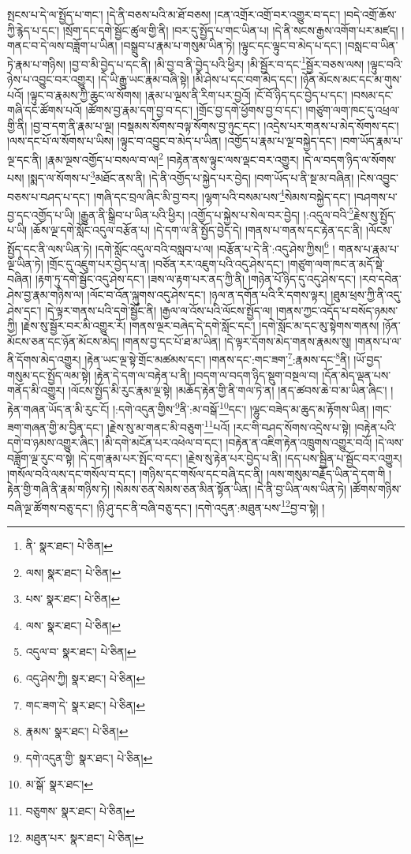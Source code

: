 སྤངས་པ་དེ་ལ་སྤྱོད་པ་གང་། །དེ་ནི་བཅས་པའི་མ་ཐོ་བཅས། །ངན་འགྲོར་འགྲོ་བར་འགྱུར་བ་དང་། །བདེ་འགྲོ་ཆོས་ཀྱི་རྙེད་པ་དང་། །སྲོག་དང་དགེ་སྦྱོང་ཚུལ་གྱི་ནི། །བར་དུ་སྤྱོད་པ་གང་ཡིན་པ། །དེ་ནི་སངས་རྒྱས་འགོག་པར་མཛད། །གནང་བ་དེ་ལས་བཟློག་པ་ཡིན། །བསྒྲུབ་པ་རྣམ་པ་གསུམ་ཡིན་ཏེ། །ལྟུང་དང་ལྟུང་བ་མེད་པ་དང་། །བསླང་བ་ཡིན་ཏེ་རྣམ་པ་གཉིས། །བྱ་བ་མི་བྱེད་པ་དང་ནི། །མི་བྱ་བ་ནི་བྱེད་པའི་ཕྱིར། །མི་སྦྱོར་བ་དང་\footnote{ནི་  སྣར་ཐང་།  པེ་ཅིན། }སྦྱོར་བཅས་ལས། །ལྟུང་བའི་ཉེས་པ་འབྱུང་བར་འགྱུར། །དེ་ཡི་རྒྱུ་ཡང་རྣམ་བཞི་སྟེ། །མི་ཤེས་པ་དང་བག་མེད་དང་། །ཉོན་མོངས་མང་དང་མ་གུས་པའོ། །ལྟུང་བ་རྣམས་ཀྱི་ཆུང་ལ་སོགས། །རྣམ་པ་ལྔས་ནི་རིག་པར་བྱའོ། །ངོ་བོ་ཉིད་དང་བྱེད་པ་དང་། །བསམ་དང་གཞི་དང་ཚོགས་པའོ། །ཚོགས་བྱ་རྣམ་དག་བྱ་བ་དང་། །གྲོང་བྱ་དགེ་ཕྱོགས་བྱ་བ་དང་། །གཙུག་ལག་ཁང་དུ་འཕྲལ་གྱི་ནི། །བྱ་བ་དག་ནི་རྣམ་པ་ལྔ། །བསྡམས་སོགས་བལྟ་སོགས་བྱ་ཉུང་དང་། །འདྲེས་པར་གནས་པ་མེད་སོགས་དང་། །ལས་དང་པོ་ལ་སོགས་པ་ཡིས། །ལྟུང་བ་འབྱུང་བ་མེད་པ་ཡིན། །འགྱོད་པ་རྣམ་པ་ལྔ་བསྐྱེད་དང་། །བག་ཡོད་རྣམ་པ་ལྔ་དང་ནི། །རྣམ་ལྔས་འགྱོད་པ་བསལ་བ་ལ།\footnote{ལས།  སྣར་ཐང་།  པེ་ཅིན། } །བརྟེན་ནས་ལྟུང་ལས་ལྡང་བར་འགྱུར། །དེ་ལ་བདག་ཉིད་ལ་སོགས་པས། །སྨད་ལ་སོགས་པ་\footnote{པས་  སྣར་ཐང་།  པེ་ཅིན། }མཐོང་ནས་ནི། །དེ་ནི་འགྱོད་པ་སྐྱེད་པར་བྱེད། །བག་ཡོད་པ་ནི་སྔ་མ་བཞིན། །ངེས་འབྱུང་བཅས་པ་བཤད་པ་དང་། །གཞི་དང་བྲལ་ཞིང་མི་བྱ་བར། །ལྷག་པའི་བསམ་པས་\footnote{ལས་  སྣར་ཐང་།  པེ་ཅིན། }སེམས་བསྐྱེད་དང་། །བཤགས་པ་བྱ་དང་འགྱོད་པ་ཡི། །རྒྱུན་ནི་སྒྲིབ་པ་ཡིན་པའི་ཕྱིར། །འགྱོད་པ་སྐྱེས་པ་སེལ་བར་བྱེད། །:འདུལ་བའི་\footnote{འདུལ་བ་  སྣར་ཐང་།  པེ་ཅིན། }རྗེས་སུ་སྤྱོད་པ་ཡི། །ཆོས་ལྔ་དགེ་སློང་འདུལ་བརྩོན་པ། །དེ་དག་ལ་ནི་སྤྱོད་བྱེད་དེ། །གནས་པ་གནས་དང་རྟེན་དང་ནི། །ལོངས་སྤྱོད་དང་ནི་ལས་ཡིན་ཏེ། །དགེ་སློང་འདུལ་བའི་བསླབ་པ་ལ། །བརྩོན་པ་དེ་ནི་:འདུ་ཤེས་ཀྱིས།\footnote{འདུ་ཤེས་ཀྱི།  སྣར་ཐང་།  པེ་ཅིན། } །
གནས་པ་རྣམ་པ་ལྔ་ཡིན་ཏེ། །གྲོང་དུ་འཇུག་པར་བྱེད་པ་ན། །བཙོན་རར་འཇུག་པའི་འདུ་ཤེས་དང་། །གཙུག་ལག་ཁང་ན་མདོ་སྡེ་བཞིན། །རྟག་ཏུ་དགེ་སྦྱོང་འདུ་ཤེས་དང་། །ཟས་ལ་རྟག་པར་ནད་ཀྱི་ནི། །གཉེན་པོ་ཉིད་དུ་འདུ་ཤེས་དང་། །རབ་དབེན་ཤེས་བྱ་རྣམ་གཉིས་ལ། །ལོང་བ་འོན་ལྐུགས་འདུ་ཤེས་དང་། །ཉལ་ན་དགོན་པའི་རི་དགས་ལྟར། །ཐུམ་ཕྲས་ཀྱི་ནི་འདུ་ཤེས་དང་། །དེ་ལྟར་གནས་པའི་དགེ་སྦྱོང་ནི། །རྒྱལ་ལ་འོས་པའི་ལོངས་སྤྱོད་ལ། །གནས་ཀྱང་འདོད་པ་བསོད་ཉམས་ཀྱི། །རྗེས་སུ་སྦྱོར་བར་མི་འགྱུར་རོ། །གནས་ལྔར་བཞེད་དེ་དགེ་སློང་དང་། །དགེ་སློང་མ་དང་མུ་སྟེགས་གནས། །ཉོན་མོངས་ཅན་དང་ཉོན་མོངས་མེད། །གནས་བྱ་དང་པོ་ཐ་མ་ཡིན། །དེ་ལྟར་དོགས་མེད་གནས་རྣམས་སུ། །གནས་པ་ལ་ནི་དོགས་མེད་འགྱུར། །རྟེན་ཡང་ལྔ་སྟེ་གྲོང་མཚམས་དང་། །གནས་དང་:གང་ཟག་\footnote{གང་ཟག་དེ་  སྣར་ཐང་།  པེ་ཅིན། }:རྣམས་དང་\footnote{རྣམས་  སྣར་ཐང་།  པེ་ཅིན། }ནི། །ཡོ་བྱད་གསུམ་དང་སྤྱོད་ལམ་སྟེ། །རྟེན་དེ་དག་ལ་བརྟེན་པ་ནི། །བདག་ལ་བདག་ཉིད་སྡུག་བསྔལ་བ། །དོན་མེད་ལྡན་པས་གནོད་མི་འགྱུར། །ལོངས་སྤྱོད་མི་རུང་རྣམ་ལྔ་སྟེ། །མཆོད་རྟེན་གྱི་ནི་གལ་ཏེ་ན། །ནད་ཚབས་ཆེ་བ་མ་ཡིན་ཞིང་། །རྟེན་གཞན་ཡོད་ན་མི་རུང་ངོ། །:དགེ་འདུན་གྱིས་\footnote{དགེ་འདུན་གྱི་  སྣར་ཐང་།  པེ་ཅིན། }ནི་:མ་བསྒོ་\footnote{མ་སྒོ་  སྣར་ཐང་། }དང་། །ལྷུང་བཟེད་མ་ཆུད་མ་རྟོགས་ཡིན། །གང་ཟག་གཞན་གྱི་མ་བྱིན་དང་། །རྗེས་སུ་མ་གནང་མི་བཅུག་\footnote{བཅུགས་  སྣར་ཐང་།  པེ་ཅིན། }པའོ། །རང་གི་བཤད་སོགས་འདྲེས་པ་སྟེ། །བརྟེན་པའི་དགེ་བ་ཉམས་འགྱུར་ཞིང་། །མི་དགེ་མངོན་པར་འཕེལ་བ་དང་། །བརྟེན་ན་འཇིག་རྟེན་འཁྲུགས་འགྱུར་བའོ། །དེ་ལས་བཟློག་ལྔ་རུང་བ་སྟེ། །དེ་དག་རྣམ་པར་སྤོང་བ་དང་། །རྗེས་སུ་རྟེན་པར་བྱེད་པ་ནི། །དད་པས་སྦྱིན་པ་སྦྱོང་བར་འགྱུར། །གསོལ་བའི་ལས་དང་གསོལ་བ་དང་། །གཉིས་དང་གསོལ་དང་བཞི་དང་ནི། །ལས་གསུམ་བརྗོད་ཡིན་དེ་དག་གི །རྟེན་གྱི་གཞི་ནི་རྣམ་གཉིས་ཏེ། །སེམས་ཅན་སེམས་ཅན་མིན་སྟོན་ཡིན། །དེ་ནི་བྱ་ཡིན་ལས་ཡིན་ཏེ། །ཚོགས་གཉིས་བཞི་ལྔ་ཚོགས་བཅུ་དང་། །ཉི་ཤུ་དང་ནི་བཞི་བཅུ་དང་། །དགེ་འདུན་:མཐུན་པས་\footnote{མཐུན་པར་  སྣར་ཐང་།  པེ་ཅིན། }བྱ་བ་སྟེ། །
